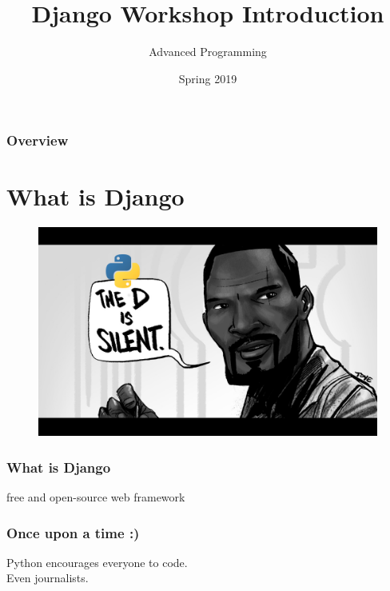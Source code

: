 \documentclass{beamer}
\title[Django Workshop]{Django Workshop Introduction} %
\author{Advanced Programming} %
\institute[AUT] %
{
	Amirkabir University of Technology\\ %
	\medskip
	\textit{} %
}
\date{Spring 2019} %
\begin{document}
	
	\begin{frame}
		\titlepage %
	\end{frame}

	\begin{frame}
	\frametitle{Overview} %
	\tableofcontents %
	\end{frame}


\section{What is Django} 

\begin{frame}
\begin{figure}
	\includegraphics[width=\linewidth]{Pics/PyDjango.jpg}
\end{figure}
\end{frame}

\begin{frame}
\frametitle{What is Django}
	\centering
	\Large
	free and open-source \color{green}web framework \color{black}
\end{frame}

\begin{frame}
\frametitle{Once upon a time :)}
	\centering
	\large
	Python encourages everyone to code.\\
	Even \color{green}journalists.\color{black}
\end{frame}
\end{document}
